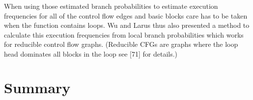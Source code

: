 When using those estimated branch probabilities to estimate execution frequencies
for all of the control flow edges and basic blocks care has to be taken
when the function contains loops. Wu and Larus thus also presented a method
to calculate this execution frequencies from local branch probabilities which
works for reducible control flow graphs. (Reducible CFGs are graphs where
the loop head dominates all blocks in the loop see [71] for details.)

\section{Summary}

